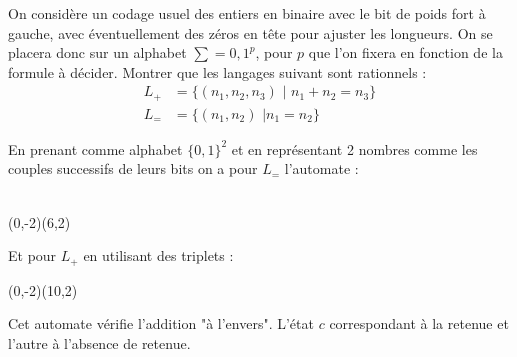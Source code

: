 \documentclass[12pt,letterpaper,boxed]{hmcpset}
\begin{document}
\begin{problem} [Question 2]
On considère un codage usuel des entiers en binaire avec le bit de poids fort à
gauche, avec éventuellement des zéros en tête pour ajuster les longueurs. On se placera
donc sur un alphabet $\sum = {0, 1}^{p}$, pour $p$ que l’on fixera en fonction de la
formule à décider. Montrer que les langages suivant sont rationnels :
\begin{align*}
L_{+} & = \{(n_{1},n_{2},n_{3}) \, \, | \, \, n_{1} + n_{2} = n_{3} \} \\
L_{=} & = \{(n_{1}, n_{2}) \, \, | n_{1} = n_{2}\}
\end{align*}


\end{problem}
\begin{solution}
En prenant comme alphabet $\{0,1\}^2$ et en représentant 2 nombres comme les couples successifs de leurs bits on a pour $L_{=}$ l'automate :  \\ \\

\begin{center}
\begin{VCPicture}{(0,-2)(6,2)}


 


\end{VCPicture}
\end{center}



\newpage
Et pour $L_{+}$ en utilisant des triplets :  \\

\begin{center}
\begin{VCPicture}{(0,-2)(10,2)}

 

 
 


\end{VCPicture}
\end{center}


Cet automate vérifie l'addition "à l'envers". L'état $c$ correspondant à la retenue et l'autre à l'absence de retenue.

\end{solution}
\end{document}
